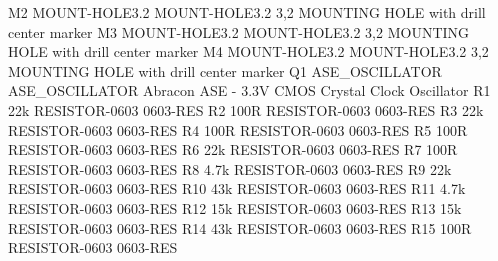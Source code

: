 \documentclass[11pt, a4paper]{article}[2009/11/13]
\begin{document}
M2      MOUNT-HOLE3.2 MOUNT-HOLE3.2     3,2                   MOUNTING HOLE with drill center marker                                    
M3      MOUNT-HOLE3.2 MOUNT-HOLE3.2     3,2                   MOUNTING HOLE with drill center marker                                    
M4      MOUNT-HOLE3.2 MOUNT-HOLE3.2     3,2                   MOUNTING HOLE with drill center marker                                    
Q1                    ASE_OSCILLATOR    ASE_OSCILLATOR        Abracon ASE - 3.3V CMOS Crystal Clock Oscillator                          
R1      22k           RESISTOR-0603     0603-RES                                                                                        
R2      100R          RESISTOR-0603     0603-RES                                                                                        
R3      22k           RESISTOR-0603     0603-RES                                                                                        
R4      100R          RESISTOR-0603     0603-RES                                                                                        
R5      100R          RESISTOR-0603     0603-RES                                                                                        
R6      22k           RESISTOR-0603     0603-RES                                                                                        
R7      100R          RESISTOR-0603     0603-RES                                                                                        
R8      4.7k          RESISTOR-0603     0603-RES                                                                                        
R9      22k           RESISTOR-0603     0603-RES                                                                                        
R10     43k           RESISTOR-0603     0603-RES                                                                                        
R11     4.7k          RESISTOR-0603     0603-RES                                                                                        
R12     15k           RESISTOR-0603     0603-RES                                                                                        
R13     15k           RESISTOR-0603     0603-RES                                                                                        
R14     43k           RESISTOR-0603     0603-RES                                                                                        
R15     100R          RESISTOR-0603     0603-RES                                                                                        
\end{document}
